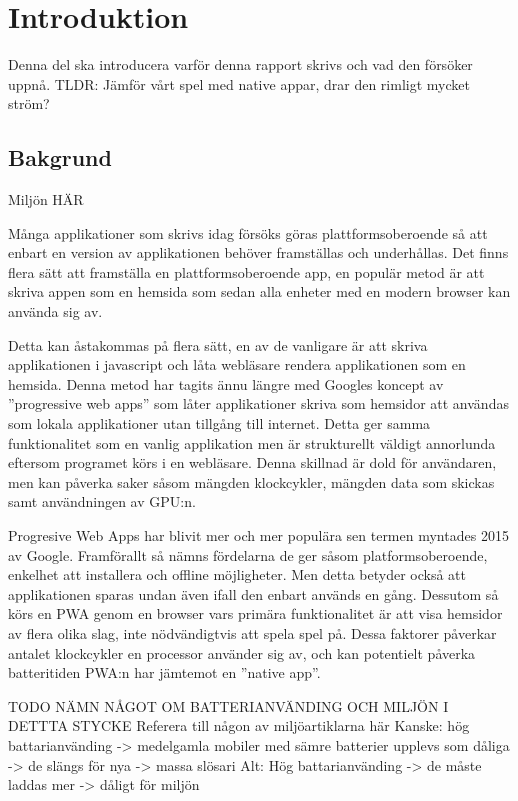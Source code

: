 \section{Introduktion}
\label{sec:joel_a-introduction}
Denna del ska introducera varför denna rapport skrivs och vad den försöker uppnå. TLDR: Jämför vårt spel med native appar, drar den rimligt mycket ström?

\subsection{Bakgrund}

Miljön HÄR

Många applikationer som skrivs idag försöks göras plattformsoberoende så att enbart en version av applikationen behöver framställas och underhållas. Det finns flera sätt att framställa en plattformsoberoende app, en populär metod är att skriva appen som en hemsida som sedan alla enheter med en modern browser kan använda sig av.

Detta kan åstakommas på flera sätt, en av de vanligare är att skriva applikationen i javascript och låta webläsare rendera applikationen som en hemsida. Denna metod har tagits ännu längre med Googles koncept av ''progressive web apps'' som låter applikationer skriva som hemsidor att användas som lokala applikationer utan tillgång till internet. Detta ger samma funktionalitet som en vanlig applikation men är strukturellt väldigt annorlunda eftersom programet körs i en webläsare. Denna skillnad är dold för användaren, men kan påverka saker såsom mängden klockcykler, mängden data som skickas samt användningen av GPU:n. 





Progresive Web Apps har blivit mer och mer populära sen termen myntades 2015 av Google. Framförallt så nämns fördelarna de ger såsom platformsoberoende, enkelhet att installera och offline möjligheter. Men detta betyder också att applikationen sparas undan även ifall den enbart används en gång. Dessutom så körs en PWA genom en browser vars primära funktionalitet är att visa hemsidor av flera olika slag, inte nödvändigtvis att spela spel på. Dessa faktorer påverkar antalet klockcykler en processor använder sig av, och kan potentielt påverka batteritiden PWA:n har jämtemot en ''native app''.

TODO NÄMN NÅGOT OM BATTERIANVÄNDING OCH MILJÖN I DETTTA STYCKE
Referera till någon av miljöartiklarna här
Kanske: hög battarianvänding -> medelgamla mobiler med sämre batterier upplevs som dåliga -> de slängs för nya -> massa slösari
Alt: Hög battarianvänding -> de måste laddas mer -> dåligt för miljön

